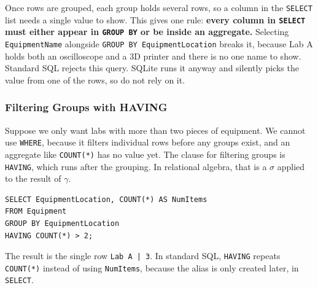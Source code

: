 Once rows are grouped, each group holds several rows, so a column in the \texttt{SELECT} list needs a single value to show. This gives one rule: \textbf{every column in \texttt{SELECT} must either appear in \texttt{GROUP BY} or be inside an aggregate.} Selecting \texttt{EquipmentName} alongside \texttt{GROUP BY EquipmentLocation} breaks it, because Lab A holds both an oscilloscope and a 3D printer and there is no one name to show. Standard SQL rejects this query. SQLite runs it anyway and silently picks the value from one of the rows, so do not rely on it.

\subsubsection{Filtering Groups with HAVING}
Suppose we only want labs with more than two pieces of equipment. We cannot use \texttt{WHERE}, because it filters individual rows before any groups exist, and an aggregate like \texttt{COUNT(*)} has no value yet. The clause for filtering groups is \texttt{HAVING}, which runs after the grouping. In relational algebra, that is a $\sigma$ applied to the result of $\gamma$.

\begin{translation}
  \sqlrow
\begin{verbatim}
SELECT EquipmentLocation, COUNT(*) AS NumItems
FROM Equipment
GROUP BY EquipmentLocation
HAVING COUNT(*) > 2;
\end{verbatim}
\end{translation}

The result is the single row \texttt{Lab A | 3}. In standard SQL, \texttt{HAVING} repeats \texttt{COUNT(*)} instead of using \texttt{NumItems}, because the alias is only created later, in \texttt{SELECT}.

